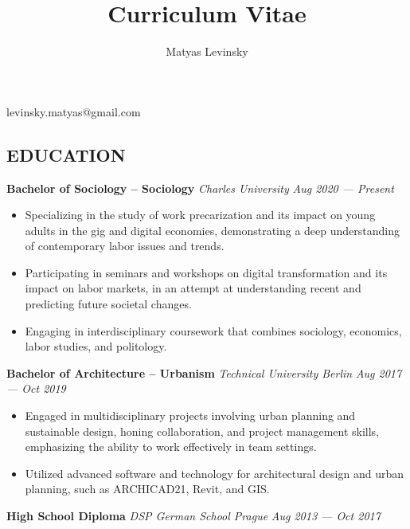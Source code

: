 \documentclass[
  letterpaper,
  DIV=11,
  numbers=noendperiod]{scrartcl}
\title{Curriculum Vitae}
\author{Matyas Levinsky}
\date{}
\providecommand{\tightlist}{%
  \setlength{\itemsep}{0pt}\setlength{\parskip}{0pt}}\usepackage{longtable,booktabs,array}
\begin{document}
\maketitle
\ifdefined\Shaded\renewenvironment{Shaded}{\begin{tcolorbox}[boxrule=0pt, frame hidden, enhanced, interior hidden, borderline west={3pt}{0pt}{shadecolor}, breakable, sharp corners]}{\end{tcolorbox}}\fi

levinsky.matyas@gmail.com

\hypertarget{education}{%
\subsection{EDUCATION}\label{education}}

\textbf{Bachelor of Sociology -- Sociology} \emph{Charles University}
{\emph{Aug 2020 --- Present}}

\begin{itemize}
\tightlist
\item
  Specializing in the study of work precarization and its impact on
  young adults in the gig and digital economies, demonstrating a deep
  understanding of contemporary labor issues and trends.
\item
  Participating in seminars and workshops on digital transformation and
  its impact on labor markets, in an attempt at understanding recent and
  predicting future societal changes.
\item
  Engaging in interdisciplinary coursework that combines sociology,
  economics, labor studies, and politology.
\end{itemize}

\textbf{Bachelor of Architecture -- Urbanism} \emph{Technical University
Berlin} {\emph{Aug 2017 --- Oct 2019}}

\begin{itemize}
\item
  Engaged in multidisciplinary projects involving urban planning and
  sustainable design, honing collaboration, and project management
  skills, emphasizing the ability to work effectively in team settings.
\item
  Utilized advanced software and technology for architectural design and
  urban planning, such as ARCHICAD21, Revit, and GIS.
\end{itemize}

\textbf{High School Diploma} \emph{DSP \textbar{} German School Prague}
{\emph{Aug 2013 --- Oct 2017}}
\end{document}
